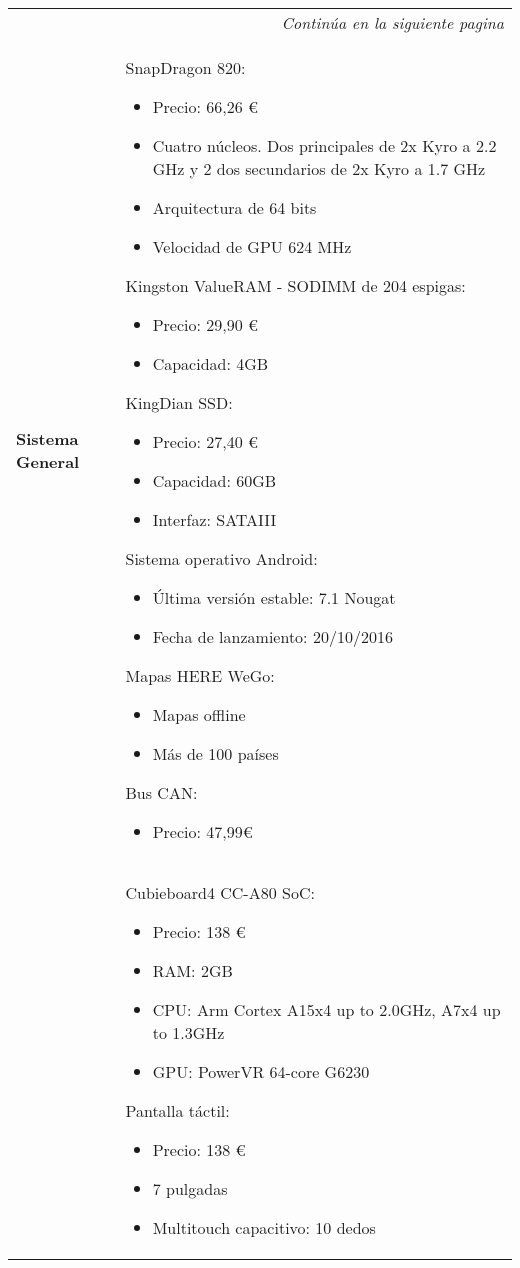 \begin{center}
\begin{longtable}{p{5cm} p{8cm}}

\hline
\endfirsthead
\hline
\endhead

\hline \multicolumn{2}{r}{\textit{Continúa en la siguiente pagina}} \\
\endfoot
\endlastfoot

\textbf{Sistema General} &
SnapDragon 820:
\begin{itemize}
    \item Precio: 66,26 \euro
    \item Cuatro núcleos. Dos principales de 2x Kyro a 2.2 GHz y 2 dos secundarios de 2x Kyro a 1.7 GHz
    \item Arquitectura de 64 bits
    \item Velocidad de GPU 624 MHz
\end{itemize}
Kingston ValueRAM - SODIMM de 204 espigas:
\begin{itemize}
    \item Precio: 29,90 \euro
    \item Capacidad: 4GB
\end{itemize}
KingDian SSD:
\begin{itemize}
    \item Precio: 27,40 \euro
    \item Capacidad: 60GB
    \item Interfaz: SATAIII
\end{itemize}
Sistema operativo Android:
\begin{itemize}
    \item Última versión estable: 7.1 Nougat
    \item Fecha de lanzamiento: 20/10/2016
\end{itemize}
Mapas HERE WeGo:
\begin{itemize}
    \item Mapas offline
    \item Más de 100 países
\end{itemize}
Bus CAN:
\begin{itemize}
    \item Precio: 47,99\euro
\end{itemize}
\\
&
Cubieboard4 CC-A80 SoC:
\begin{itemize}
    \item Precio: 138 \euro
    \item RAM: 2GB
    \item CPU:  Arm Cortex A15x4 up to 2.0GHz, A7x4 up to 1.3GHz
    \item GPU:  PowerVR 64-core G6230
\end{itemize}
Pantalla táctil:
\begin{itemize}
    \item Precio: 138 \euro
    \item 7 pulgadas
    \item Multitouch capacitivo: 10 dedos
\end{itemize}
\\ \hline


\end{longtable}
\end{center}

